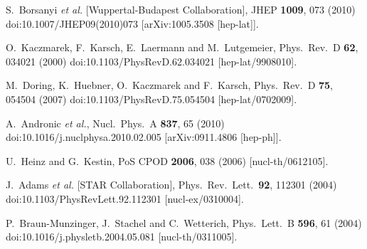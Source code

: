 \documentclass[12pt]{article}
\begin{document}
\begin{thebibliography}{99}
  S.~Borsanyi {\it et al.} [Wuppertal-Budapest Collaboration],
  JHEP {\bf 1009}, 073 (2010)
  doi:10.1007/JHEP09(2010)073
  [arXiv:1005.3508 [hep-lat]].
	
  O.~Kaczmarek, F.~Karsch, E.~Laermann and M.~Lutgemeier,
  Phys.\ Rev.\ D {\bf 62}, 034021 (2000)
  doi:10.1103/PhysRevD.62.034021
  [hep-lat/9908010].
	
  M.~Doring, K.~Huebner, O.~Kaczmarek and F.~Karsch,
  Phys.\ Rev.\ D {\bf 75}, 054504 (2007)
  doi:10.1103/PhysRevD.75.054504
  [hep-lat/0702009].

  A.~Andronic {\it et al.},
  Nucl.\ Phys.\ A {\bf 837}, 65 (2010)
  doi:10.1016/j.nuclphysa.2010.02.005
  [arXiv:0911.4806 [hep-ph]].
  		
  U.~Heinz and G.~Kestin,
  PoS CPOD {\bf 2006}, 038 (2006)
  [nucl-th/0612105].

  J.~Adams {\it et al.} [STAR Collaboration],
  Phys.\ Rev.\ Lett.\  {\bf 92}, 112301 (2004)
  doi:10.1103/PhysRevLett.92.112301
  [nucl-ex/0310004].

		
  P.~Braun-Munzinger, J.~Stachel and C.~Wetterich,
  Phys.\ Lett.\ B {\bf 596}, 61 (2004)
  doi:10.1016/j.physletb.2004.05.081
  [nucl-th/0311005].
		

\end{thebibliography}
\end{document}

